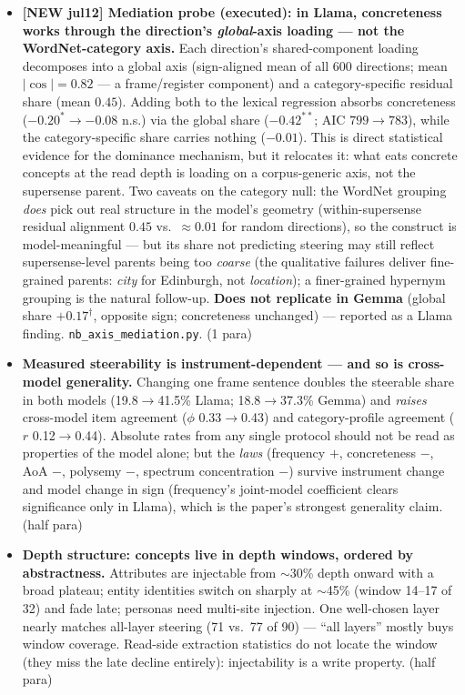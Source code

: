 \documentclass[11pt]{article}
\newenvironment{outline}{\color{gray!70!black}\begin{itemize}[leftmargin=1.2em,itemsep=1pt]}{\end{itemize}\color{black}}
\begin{document}
\begin{outline}
\item \textbf{[NEW jul12] Mediation probe (executed): in Llama, concreteness works through the direction's \emph{global}-axis loading --- not the WordNet-category axis.} Each direction's shared-component loading decomposes into a global axis (sign-aligned mean of all 600 directions; mean $|\cos| = 0.82$ --- a frame/register component) and a category-specific residual share (mean $0.45$). Adding both to the lexical regression absorbs concreteness ($-0.20^{*} \to -0.08$ n.s.) via the global share ($-0.42^{**}$; AIC $799 \to 783$), while the category-specific share carries nothing ($-0.01$). This is direct statistical evidence for the dominance mechanism, but it relocates it: what eats concrete concepts at the read depth is loading on a corpus-generic axis, not the supersense parent. Two caveats on the category null: the WordNet grouping \emph{does} pick out real structure in the model's geometry (within-supersense residual alignment $0.45$ vs.\ ${\approx}0.01$ for random directions), so the construct is model-meaningful --- but its share not predicting steering may still reflect supersense-level parents being too \emph{coarse} (the qualitative failures deliver fine-grained parents: \emph{city} for Edinburgh, not \emph{location}); a finer-grained hypernym grouping is the natural follow-up. \textbf{Does not replicate in Gemma} (global share $+0.17^{\dagger}$, opposite sign; concreteness unchanged) --- reported as a Llama finding. \texttt{nb\_axis\_mediation.py}. (1 para)
\item \textbf{Measured steerability is instrument-dependent --- and so is cross-model generality.} Changing one frame sentence doubles the steerable share in both models (19.8$\to$41.5\% Llama; 18.8$\to$37.3\% Gemma) and \emph{raises} cross-model item agreement ($\phi$ 0.33$\to$0.43) and category-profile agreement ($r$ 0.12$\to$0.44). Absolute rates from any single protocol should not be read as properties of the model alone; but the \emph{laws} (frequency $+$, concreteness $-$, AoA $-$, polysemy $-$, spectrum concentration $-$) survive instrument change and model change in sign (frequency's joint-model coefficient clears significance only in Llama), which is the paper's strongest generality claim. (half para)
\item \textbf{Depth structure: concepts live in depth windows, ordered by abstractness.} Attributes are injectable from $\sim$30\% depth onward with a broad plateau; entity identities switch on sharply at $\sim$45\% (window 14--17 of 32) and fade late; personas need multi-site injection. One well-chosen layer nearly matches all-layer steering (71 vs.\ 77 of 90) --- ``all layers'' mostly buys window coverage. Read-side extraction statistics do not locate the window (they miss the late decline entirely): injectability is a write property. (half para)

\end{outline}
\end{document}

